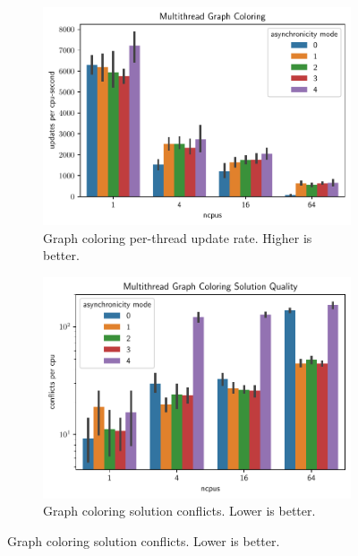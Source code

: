   \begin{figure}[thpb]
      \centering
    \begin{subfigure}[b]{0.49\textwidth}
      \centering
      \includegraphics[width=\linewidth]{chart/multithread-graph-coloring}
     \caption{Graph coloring per-thread update rate. Higher is better.}
         \label{fig:multithread_graph_coloring_update_rate}
      \end{subfigure}

    \begin{subfigure}[b]{0.49\textwidth}
      \centering
      \includegraphics[width=\linewidth]{chart/multithread-graph-coloring-solution-quality}
      \caption{Graph coloring solution conflicts. Lower is better.}
         \label{fig:multithread_graph_coloring_solution_quality}
    \end{subfigure}



\end{figure}
